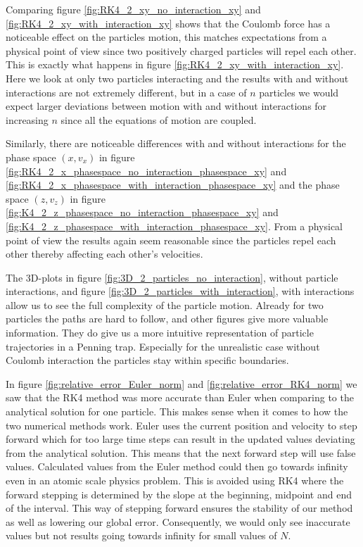 \documentclass[english,notitlepage,reprint,nofootinbib]{revtex4-1}  %
\begin{document}
Comparing figure \ref{fig:RK4_2_xy_no_interaction_xy} and \ref{fig:RK4_2_xy_with_interaction_xy} shows that the Coulomb force has a noticeable effect on
the particles motion, this matches expectations from a physical point of view since two positively charged particles will repel each other. This is exactly what happens in figure \ref{fig:RK4_2_xy_with_interaction_xy}. Here we look at only two particles interacting and the results with and without interactions are not extremely different,
but in a case of $n$ particles we would expect larger deviations between motion with and without interactions for increasing $n$ since all the equations of motion are coupled.

Similarly, there are noticeable differences with and without interactions for the phase space $(x, v_x)$ in figure \ref{fig:RK4_2_x_phasespace_no_interaction_phasespace_xy}
and \ref{fig:RK4_2_x_phasespace_with_interaction_phasespace_xy} and the phase space $(z, v_z)$ in figure \ref{fig:K4_2_z_phasespace_no_interaction_phasespace_xy}
and \ref{fig:K4_2_z_phasespace_with_interaction_phasespace_xy}. From a physical point of view the results again seem reasonable since the particles
repel each other thereby affecting each other's velocities.

The 3D-plots in figure \ref{fig:3D_2_particles_no_interaction}, without
particle interactions, and figure \ref{fig:3D_2_particles_with_interaction}, with interactions allow us to see the full complexity of the particle motion.
Already for two particles the paths are hard to follow, and other figures give more valuable information. They do give us a more intuitive representation of particle trajectories in a Penning trap. Especially for the unrealistic case without Coulomb interaction the particles stay within specific boundaries.

In figure \ref{fig:relative_error_Euler_norm} and \ref{fig:relative_error_RK4_norm} we saw that the RK4 method was more accurate than Euler when comparing to the analytical solution for one particle. This makes sense when it comes to how the two numerical methods work. Euler uses the current position and velocity to step forward which for too large time steps can result in the updated values deviating from the analytical solution. This means that the next forward step will use false values. Calculated values from the Euler method could then go towards infinity even in an atomic scale physics problem. This is avoided using RK4 where the forward stepping is determined by the slope at the beginning, midpoint and end of the interval. This way of stepping forward ensures the stability of our method as well as lowering our global error. Consequently, we would only see inaccurate values but not results going towards infinity for small values of $N$.
\end{document}
